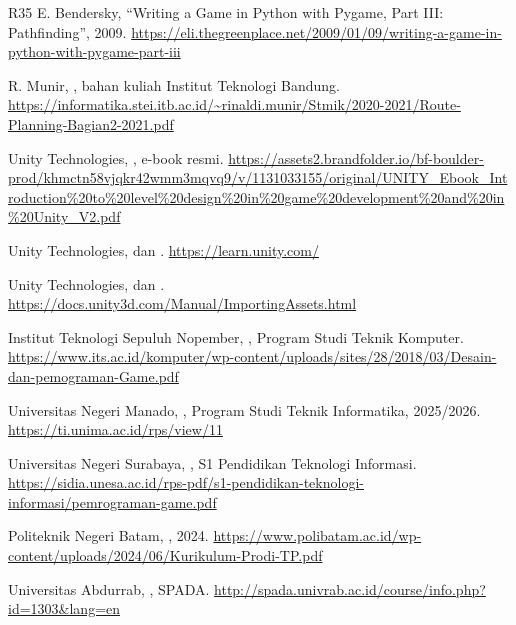 \begin{sloppypar}
\begin{thebibliography}{R35}
  E. Bendersky, ``Writing a Game in Python with Pygame, Part III:
  Pathfinding'', 2009.
  \url{https://eli.thegreenplace.net/2009/01/09/writing-a-game-in-python-with-pygame-part-iii}

  R. Munir, , bahan
  kuliah Institut Teknologi Bandung.
  \url{https://informatika.stei.itb.ac.id/~rinaldi.munir/Stmik/2020-2021/Route-Planning-Bagian2-2021.pdf}

  Unity Technologies, , e-book resmi.
  \url{https://assets2.brandfolder.io/bf-boulder-prod/khmctn58vjqkr42wmm3mqvq9/v/1131033155/original/UNITY_Ebook_Introduction%20to%20level%20design%20in%20game%20development%20and%20in%20Unity_V2.pdf}

  Unity Technologies,  dan
  .
  \url{https://learn.unity.com/}

  Unity Technologies,  dan
  .
  \url{https://docs.unity3d.com/Manual/ImportingAssets.html}

  Institut Teknologi Sepuluh Nopember, , Program Studi Teknik Komputer.
  \url{https://www.its.ac.id/komputer/wp-content/uploads/sites/28/2018/03/Desain-dan-pemograman-Game.pdf}

  Universitas Negeri Manado, , Program
  Studi Teknik Informatika, 2025/2026.
  \url{https://ti.unima.ac.id/rps/view/11}

  Universitas Negeri Surabaya, , S1
  Pendidikan Teknologi Informasi.
  \url{https://sidia.unesa.ac.id/rps-pdf/s1-pendidikan-teknologi-informasi/pemrograman-game.pdf}

  Politeknik Negeri Batam, , 2024.
  \url{https://www.polibatam.ac.id/wp-content/uploads/2024/06/Kurikulum-Prodi-TP.pdf}

  Universitas Abdurrab, ,
  SPADA. \url{http://spada.univrab.ac.id/course/info.php?id=1303&lang=en}


\end{thebibliography}
\end{sloppypar}
